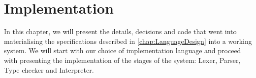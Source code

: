 \chapter{Implementation}
In this chapter, we will present the details, decisions and code that went into materialising the specifications described in \cref{chap:LanguageDesign} into a working system. We will start with our choice of implementation language and proceed with presenting the implementation of the stages of the system: Lexer, Parser, Type checker and Interpreter.




